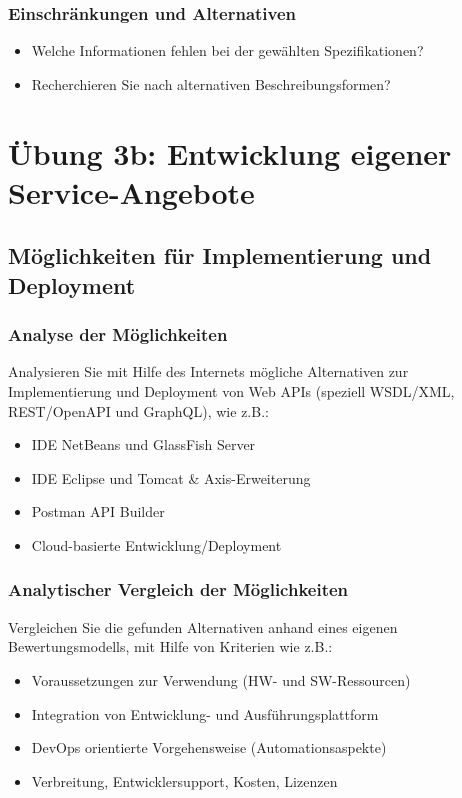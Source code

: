 \documentclass[notitlepage, hidelinks]{article}
\begin{document}
\subsubsection{Einschränkungen und Alternativen}
\begin{itemize}
\item Welche Informationen fehlen bei der gewählten Spezifikationen?
\item Recherchieren Sie nach alternativen Beschreibungsformen?
\end{itemize}

\section{Übung 3b: Entwicklung eigener Service-Angebote}
\subsection{Möglichkeiten für Implementierung und Deployment}
\subsubsection{Analyse der Möglichkeiten}
Analysieren Sie mit Hilfe des Internets mögliche Alternativen zur Implementierung und Deployment von Web APIs (speziell WSDL/XML, REST/OpenAPI und GraphQL), wie z.B.:
\begin{itemize}
\item IDE NetBeans und GlassFish Server
\item IDE Eclipse und Tomcat \& Axis-Erweiterung
\item Postman API Builder
\item Cloud-basierte Entwicklung/Deployment
\end{itemize}

\subsubsection{Analytischer Vergleich der Möglichkeiten}
Vergleichen Sie die gefunden Alternativen anhand eines eigenen Bewertungsmodells, mit Hilfe von Kriterien wie z.B.:
\begin{itemize}
\item Voraussetzungen zur Verwendung (HW- und SW-Ressourcen)
\item Integration von Entwicklung- und Ausführungsplattform
\item DevOps orientierte Vorgehensweise (Automationsaspekte)
\item Verbreitung, Entwicklersupport, Kosten, Lizenzen
\end{itemize}
\end{document}
